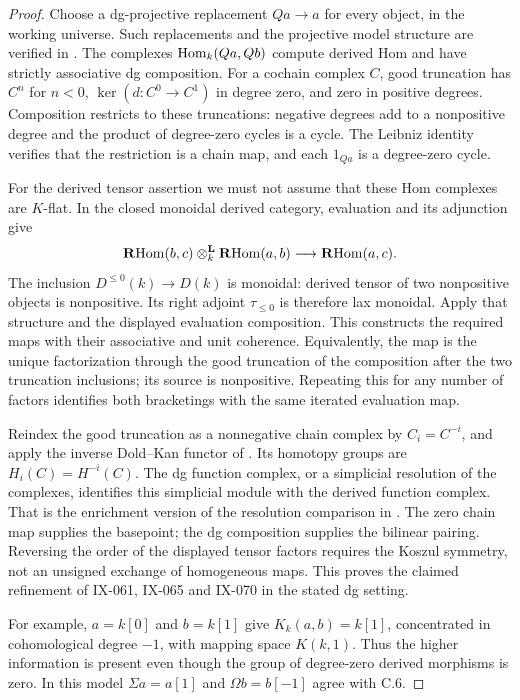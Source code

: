 \begin{proof}
Choose a dg-projective replacement $Qa\to a$ for every object, in the working universe. Such replacements and the projective model structure are verified in \citet[Proposition 3.1 and Theorem 3.2]{Keller2006DG}. The complexes $\operatorname{Hom}_k(Qa,Qb)$ compute derived Hom and have strictly associative dg composition. For a cochain complex $C$, good truncation has $C^n$ for $n<0$, $\ker(d:C^0\to C^1)$ in degree zero, and zero in positive degrees. Composition restricts to these truncations: negative degrees add to a nonpositive degree and the product of degree-zero cycles is a cycle. The Leibniz identity verifies that the restriction is a chain map, and each $1_{Qa}$ is a degree-zero cycle.

For the derived tensor assertion we must not assume that these Hom complexes are $K$-flat. In the closed monoidal derived category, evaluation and its adjunction give
\[
 \mathbf R\!\operatorname{Hom}(b,c)\otimes_k^{\mathbf L}\mathbf R\!\operatorname{Hom}(a,b)\longrightarrow\mathbf R\!\operatorname{Hom}(a,c).
\]
The inclusion $D^{\leq0}(k)\to D(k)$ is monoidal: derived tensor of two nonpositive objects is nonpositive. Its right adjoint $\tau_{\leq0}$ is therefore lax monoidal. Apply that structure and the displayed evaluation composition. This constructs the required maps with their associative and unit coherence. Equivalently, the map is the unique factorization through the good truncation of the composition after the two truncation inclusions; its source is nonpositive. Repeating this for any number of factors identifies both bracketings with the same iterated evaluation map.

Reindex the good truncation as a nonnegative chain complex by $C_i=C^{-i}$, and apply the inverse Dold--Kan functor of \citet[Theorem 14.24.3]{StacksDoldKan}. Its homotopy groups are $H_i(C)=H^{-i}(C)$. The dg function complex, or a simplicial resolution of the complexes, identifies this simplicial module with the derived function complex. That is the enrichment version of the resolution comparison in \citet[Proposition 4.4]{DwyerKan1980Function}. The zero chain map supplies the basepoint; the dg composition supplies the bilinear pairing. Reversing the order of the displayed tensor factors requires the Koszul symmetry, not an unsigned exchange of homogeneous maps. This proves the claimed refinement of IX-061, IX-065 and IX-070 in the stated dg setting.

For example, $a=k[0]$ and $b=k[1]$ give $K_k(a,b)=k[1]$, concentrated in cohomological degree $-1$, with mapping space $K(k,1)$. Thus the higher information is present even though the group of degree-zero derived morphisms is zero. In this model $\Sigma a=a[1]$ and $\Omega b=b[-1]$ agree with C.6.
\end{proof}

